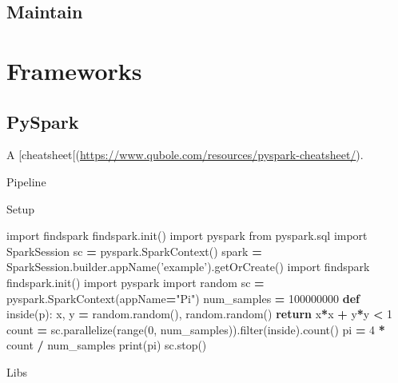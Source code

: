 \documentclass[]{book}
\newenvironment{Shaded}{\begin{snugshade}}{\end{snugshade}}
\newcommand{\KeywordTok}[1]{\textcolor[rgb]{0.13,0.29,0.53}{\textbf{#1}}}
\newcommand{\DecValTok}[1]{\textcolor[rgb]{0.00,0.00,0.81}{#1}}
\newcommand{\StringTok}[1]{\textcolor[rgb]{0.31,0.60,0.02}{#1}}
\newcommand{\ImportTok}[1]{#1}
\newcommand{\ControlFlowTok}[1]{\textcolor[rgb]{0.13,0.29,0.53}{\textbf{#1}}}
\newcommand{\OperatorTok}[1]{\textcolor[rgb]{0.81,0.36,0.00}{\textbf{#1}}}
\newcommand{\BuiltInTok}[1]{#1}
\newcommand{\NormalTok}[1]{#1}
\theoremstyle{definition}
\theoremstyle{definition}
\theoremstyle{definition}
\theoremstyle{remark}
\begin{document}
\section{Maintain}\label{maintain}

\chapter{Frameworks}\label{frameworks}

\section{PySpark}\label{pyspark}

A
{[}cheatsheet{[}(\url{https://www.qubole.com/resources/pyspark-cheatsheet/}).

Pipeline

Setup

\begin{Shaded}
\begin{Highlighting}[]
\ImportTok{import}\NormalTok{ findspark}
\NormalTok{findspark.init()}
\ImportTok{import}\NormalTok{ pyspark}
\ImportTok{from}\NormalTok{ pyspark.sql }\ImportTok{import}\NormalTok{ SparkSession}
\NormalTok{sc }\OperatorTok{=}\NormalTok{ pyspark.SparkContext()}
\NormalTok{spark }\OperatorTok{=}\NormalTok{ SparkSession.builder.appName(}\StringTok{'example'}\NormalTok{).getOrCreate()}
\ImportTok{import}\NormalTok{ findspark}
\NormalTok{findspark.init()}
\ImportTok{import}\NormalTok{ pyspark}
\ImportTok{import}\NormalTok{ random}
\NormalTok{sc }\OperatorTok{=}\NormalTok{ pyspark.SparkContext(appName}\OperatorTok{=}\StringTok{"Pi"}\NormalTok{)}
\NormalTok{num_samples }\OperatorTok{=} \DecValTok{100000000}
\KeywordTok{def}\NormalTok{ inside(p):     }
\NormalTok{    x, y }\OperatorTok{=}\NormalTok{ random.random(), random.random()}
    \ControlFlowTok{return}\NormalTok{ x}\OperatorTok{*}\NormalTok{x }\OperatorTok{+}\NormalTok{ y}\OperatorTok{*}\NormalTok{y }\OperatorTok{<} \DecValTok{1}
\NormalTok{count }\OperatorTok{=}\NormalTok{ sc.parallelize(}\BuiltInTok{range}\NormalTok{(}\DecValTok{0}\NormalTok{, num_samples)).}\BuiltInTok{filter}\NormalTok{(inside).count()}
\NormalTok{pi }\OperatorTok{=} \DecValTok{4} \OperatorTok{*}\NormalTok{ count }\OperatorTok{/}\NormalTok{ num_samples}
\BuiltInTok{print}\NormalTok{(pi)}
\NormalTok{sc.stop()}
\end{Highlighting}
\end{Shaded}

Libs
\end{document}
